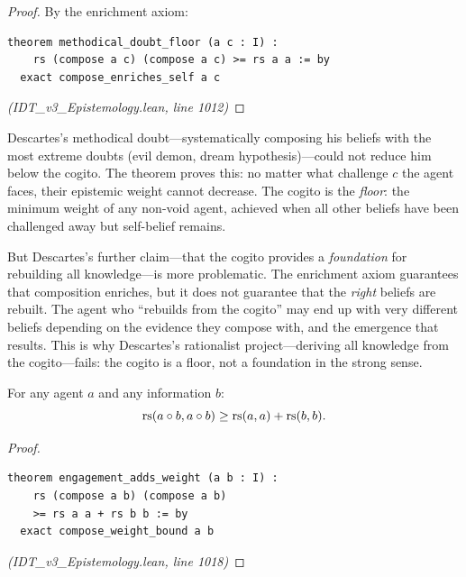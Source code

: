 \begin{proof}
By the enrichment axiom:
\begin{lstlisting}
theorem methodical_doubt_floor (a c : I) :
    rs (compose a c) (compose a c) >= rs a a := by
  exact compose_enriches_self a c
\end{lstlisting}
\textit{(IDT\_v3\_Epistemology.lean, line 1012)}
\end{proof}

\begin{interpretation}
Descartes's methodical doubt---systematically composing his beliefs with the most
extreme doubts (evil demon, dream hypothesis)---could not reduce him below the
cogito. The theorem proves this: no matter what challenge $c$ the agent faces,
their epistemic weight cannot decrease. The cogito is the \emph{floor}: the
minimum weight of any non-void agent, achieved when all other beliefs have been
challenged away but self-belief remains.

But Descartes's further claim---that the cogito provides a \emph{foundation}
for rebuilding all knowledge---is more problematic. The enrichment axiom
guarantees that composition enriches, but it does not guarantee that the
\emph{right} beliefs are rebuilt. The agent who ``rebuilds from the cogito''
may end up with very different beliefs depending on the evidence they compose
with, and the emergence that results. This is why Descartes's rationalist
project---deriving all knowledge from the cogito---fails: the cogito is a
floor, not a foundation in the strong sense.
\end{interpretation}

\begin{theorem}
\label{thm:engagement-enriches}
For any agent $a$ and any information $b$:
\[
  \mathrm{rs}(a \circ b, a \circ b) \geq \mathrm{rs}(a, a) + \mathrm{rs}(b, b).
\]
\end{theorem}

\begin{proof}
\begin{lstlisting}
theorem engagement_adds_weight (a b : I) :
    rs (compose a b) (compose a b)
    >= rs a a + rs b b := by
  exact compose_weight_bound a b
\end{lstlisting}
\textit{(IDT\_v3\_Epistemology.lean, line 1018)}
\end{proof}

